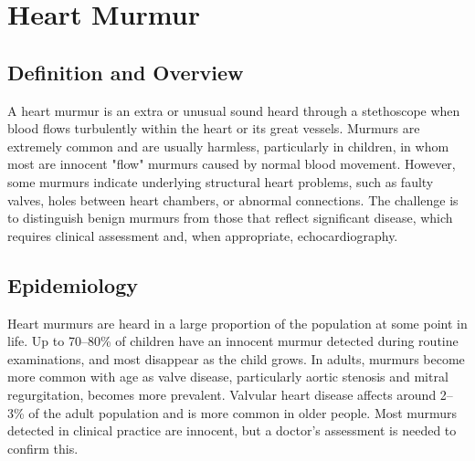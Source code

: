 \chapter{Heart Murmur}

\section*{Definition and Overview}
A heart murmur is an extra or unusual sound heard through a stethoscope when blood flows turbulently within the heart or its great vessels. Murmurs are extremely common and are usually harmless, particularly in children, in whom most are innocent "flow" murmurs caused by normal blood movement. However, some murmurs indicate underlying structural heart problems, such as faulty valves, holes between heart chambers, or abnormal connections. The challenge is to distinguish benign murmurs from those that reflect significant disease, which requires clinical assessment and, when appropriate, echocardiography.

\section*{Epidemiology}
Heart murmurs are heard in a large proportion of the population at some point in life. Up to 70--80\% of children have an innocent murmur detected during routine examinations, and most disappear as the child grows. In adults, murmurs become more common with age as valve disease, particularly aortic stenosis and mitral regurgitation, becomes more prevalent. Valvular heart disease affects around 2--3\% of the adult population and is more common in older people. Most murmurs detected in clinical practice are innocent, but a doctor's assessment is needed to confirm this.

